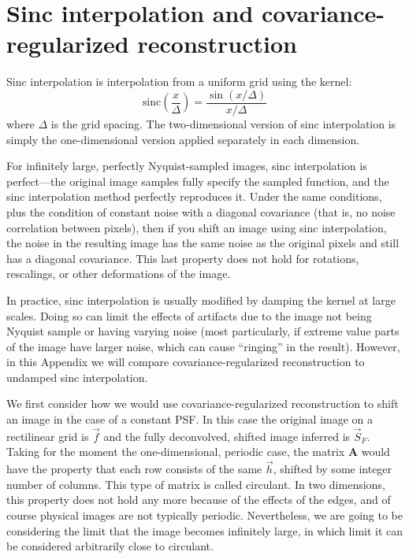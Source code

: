 \documentclass[twocolumn,tighten]{aastex61}
\newcommand{\sinc}{\ensuremath{\mathrm{sinc}}}
\begin{document}
\appendix

\section{Sinc interpolation and covariance-regularized reconstruction}

Sinc interpolation is interpolation from a uniform grid using the kernel:
\begin{equation}
\sinc\left(\frac{x}{\Delta}\right) = \frac{\sin \left(x /
  \Delta\right)}{x / \Delta} 
\end{equation}
where $\Delta$ is the grid spacing. The two-dimensional version of
sinc interpolation is simply the one-dimensional version applied
separately in each dimension.

For infinitely large, perfectly Nyquist-sampled images, sinc
interpolation is perfect---the original image samples fully specify
the sampled function, and the sinc interpolation method perfectly
reproduces it. Under the same conditions, plus the condition of
constant noise with a diagonal covariance (that is, no noise
correlation between pixels), then if you shift an image using sinc
interpolation, the noise in the resulting image has the same noise as
the original pixels and still has a diagonal covariance. This last
property does not hold for rotations, rescalings, or other
deformations of the image.

In practice, sinc interpolation is usually modified by damping the
kernel at large scales. Doing so can limit the effects of artifacts
due to the image not being Nyquist sample or having varying noise
(most particularly, if extreme value parts of the image have larger
noise, which can cause ``ringing'' in the result). However, in this
Appendix we will compare covariance-regularized reconstruction to
undamped sinc interpolation.

We first consider how we would use covariance-regularized
reconstruction to shift an image in the case of a constant PSF. In
this case the original image on a rectilinear grid is $\vec{f}$ and
the fully deconvolved, shifted image inferred is $\vec{S}_F$. Taking
for the moment the one-dimensional, periodic case, the matrix
$\mathbf{A}$ would have the property that each row consists of the
same $\vec{h}$, shifted by some integer number of columns. This type
of matrix is called circulant. In two dimensions, this property does
not hold any more because of the effects of the edges, and of course
physical images are not typically periodic. Nevertheless, we are going
to be considering the limit that the image becomes infinitely large,
in which limit it can be considered arbitrarily close to circulant.
\end{document}
